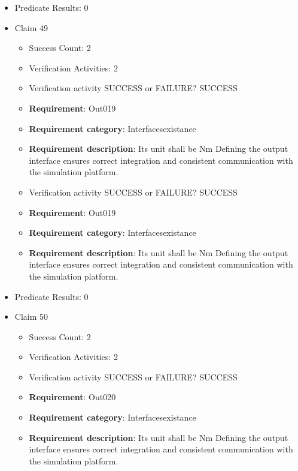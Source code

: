 \documentclass{article}
\begin{document}
\begin{itemize}
\begin{itemize}
				\end{itemize}
				
									    
				\item Predicate Results: 0

  				  \item Claim 49
				\begin{itemize}
			    	\item Success Count: 2 
			    	\item Verification Activities: 2
					\item Verification activity SUCCESS or FAILURE? SUCCESS
		
						\item \textbf{Requirement}: Out019 
						\item \textbf{Requirement category}: Interfacesexistance 
						\item \textbf{Requirement description}: Its unit shall be Nm Defining the output interface ensures correct integration and consistent communication with the simulation platform.
					
					\item Verification activity SUCCESS or FAILURE? SUCCESS
		
						\item \textbf{Requirement}: Out019 
						\item \textbf{Requirement category}: Interfacesexistance 
						\item \textbf{Requirement description}: Its unit shall be Nm Defining the output interface ensures correct integration and consistent communication with the simulation platform.
					
				\end{itemize}
				
									    
				\item Predicate Results: 0

  				  \item Claim 50
				\begin{itemize}
			    	\item Success Count: 2 
			    	\item Verification Activities: 2
					\item Verification activity SUCCESS or FAILURE? SUCCESS
		
						\item \textbf{Requirement}: Out020 
						\item \textbf{Requirement category}: Interfacesexistance 
						\item \textbf{Requirement description}: Its unit shall be Nm Defining the output interface ensures correct integration and consistent communication with the simulation platform.
					

\end{itemize}
\end{itemize}
\end{document}
